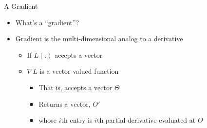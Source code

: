 \documentclass[aspectratio=169]{beamer}
\begin{document}
\begin{frame}{A Gradient}

\begin{itemize}
\item What's a ``gradient''?
\item Gradient is the multi-dimensional analog to a derivative
	\begin{itemize}
	\item If $L(.)$ accepts a vector
	\item $\nabla L$ is a vector-valued function 
	\begin{itemize}
	\item That is, accepts a vector $\Theta$
	\item Returns a vector, $\Theta'$
	\item whose $i$th entry is $i$th partial derivative evaluated at $\Theta$
\end{itemize}
	\end{itemize}
\end{itemize}

\end{frame}
\end{document}
